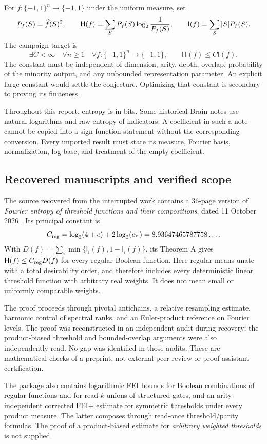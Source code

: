 \documentclass[11pt]{article}
\newcommand{\HH}{\mathsf H}\newcommand{\I}{\mathsf I}
\newcommand{\bits}{\{-1,1\}}\newcommand{\KL}{\operatorname{D}}
\newcommand{\Creg}{C_{\rm reg}}\newcommand{\Rcost}{\mathcal R_f}
\begin{document}
For $f:\bits^n\to\bits$ under the uniform measure, set
\[
 P_f(S)=\wh f(S)^2,\qquad
 \HH(f)=\sum_S P_f(S)\log_2\frac1{P_f(S)},\qquad
 \I(f)=\sum_S |S|P_f(S).
\]
The campaign target is
\begin{equation}\label{eq:full}
 \exists C<\infty\quad\forall n\ge1\quad\forall f:\bits^n\to\bits,
 \qquad \HH(f)\le C\I(f).
\end{equation}
The constant must be independent of dimension, arity, depth, overlap, probability of the minority output, and any unbounded representation parameter. An explicit large constant would settle the conjecture. Optimizing that constant is secondary to proving its finiteness.

Throughout this report, entropy is in bits. Some historical Brain notes use natural logarithms and raw entropy of indicators. A coefficient in such a note cannot be copied into a sign-function statement without the corresponding conversion. Every imported result must state its measure, Fourier basis, normalization, log base, and treatment of the empty coefficient.

\subsection{Recovered manuscripts and verified scope}

The source recovered from the interrupted work contains a 36-page version of \emph{Fourier entropy of threshold functions and their compositions}, dated 11 October 2026 \cite{Threshold}. Its principal constant is
\[
 \Creg=\log_2(4+e)+2\log_2(e\pi)
       =8.93647465787758\ldots.
\]
With $D(f)=\sum_i\min\{\I_i(f),1-\I_i(f)\}$, its Theorem A gives $\HH(f)\le\Creg D(f)$ for every regular Boolean function. Here regular means unate with a total desirability order, and therefore includes every deterministic linear threshold function with arbitrary real weights. It does not mean small or uniformly comparable weights.

The proof proceeds through pivotal antichains, a relative resampling estimate, harmonic control of spectral ranks, and an Euler-product reference on Fourier levels. The proof was reconstructed in an independent audit during recovery; the product-biased threshold and bounded-overlap arguments were also independently read. No gap was identified in those audits. These are mathematical checks of a preprint, not external peer review or proof-assistant certification.

The package also contains logarithmic FEI bounds for Boolean combinations of regular functions and for read-$k$ unions of structured gates, and an arity-independent corrected FEI+ estimate for symmetric thresholds under every product measure. The latter composes through read-once threshold/parity formulas. The proof of a product-biased estimate for \emph{arbitrary weighted thresholds} is not supplied.
\end{document}
